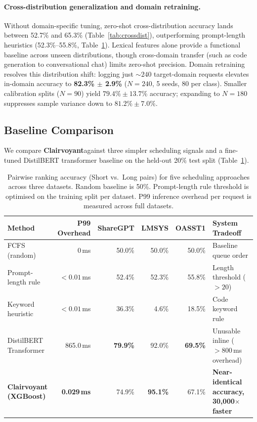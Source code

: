 \documentclass[10pt]{article}
\newcommand{\clairvoyant}{\textbf{Clairvoyant}}
\begin{document}
\paragraph{Cross-distribution generalization and domain retraining.}
Without domain-specific tuning, zero-shot cross-distribution accuracy lands between 52.7\% and 65.3\% (Table~\ref{tab:crossdist}), outperforming prompt-length heuristics (52.3\%--55.8\%, Table~\ref{tab:baselines}). Lexical features alone provide a functional baseline across unseen distributions, though cross-domain transfer (such as code generation to conversational chat) limits zero-shot precision. Domain retraining resolves this distribution shift: logging just $\sim 240$ target-domain requests elevates in-domain accuracy to \textbf{82.3\% $\pm$ 2.9\%} ($N=240$, 5 seeds, 80 per class). Smaller calibration splits ($N=90$) yield $79.4\% \pm 13.7\%$ accuracy; expanding to $N=180$ suppresses sample variance down to $81.2\% \pm 7.0\%$.

\subsection{Baseline Comparison}
\label{sec:baselines}

We compare \clairvoyant against three simpler scheduling signals and a fine-tuned DistilBERT transformer baseline on the held-out 20\% test split (Table~\ref{tab:baselines}).

\begin{table}[H]
  \centering
  \caption{Pairwise ranking accuracy (Short vs.\ Long pairs) for five scheduling approaches across three datasets. Random baseline is 50\%. Prompt-length rule threshold is optimised on the training split per dataset. P99 inference overhead per request is measured across full datasets.}
  \label{tab:baselines}
  \small
  \begin{tabular}{lrrrrp{4.2cm}}
    \toprule
    Method & P99 Overhead & ShareGPT & LMSYS & OASST1 & System Tradeoff \\
    \midrule
    FCFS (random)                  & 0\,ms         & 50.0\% & 50.0\% & 50.0\% & Baseline queue order \\
    Prompt-length rule             & $<0.01$\,ms   & 52.4\% & 52.3\% & 55.8\% & Length threshold ($>20$) \\
    Keyword heuristic              & $<0.01$\,ms   & 36.3\% & 4.6\%  & 18.5\% & Code keyword rule \\
    DistilBERT Transformer         & 865.0\,ms     & \textbf{79.9\%} & 92.0\% & \textbf{69.5\%} & Unusable inline ($>800$\,ms overhead) \\
    \textbf{Clairvoyant (XGBoost)} & \textbf{0.029\,ms} & 74.9\% & \textbf{95.1\%} & 67.1\% & \textbf{Near-identical accuracy, 30,000$\times$ faster} \\
    \bottomrule
  \end{tabular}
\end{table}
\end{document}
